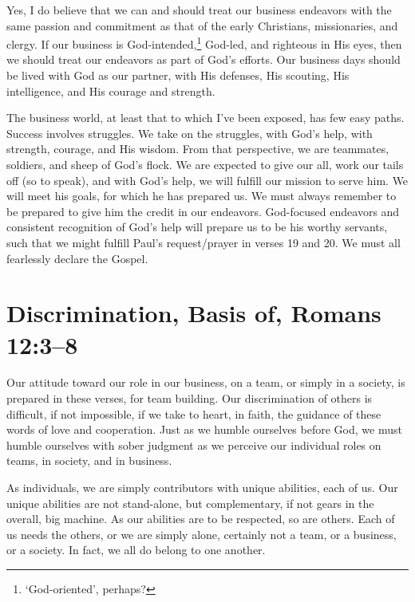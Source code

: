 \documentclass[12pt]{memoir}
\begin{document}
Yes, I do believe that we can and should treat our business endeavors
with the same passion and commitment as that of the early Christians,
missionaries, and clergy. If our business is God-intended,\footnote{`God-oriented', perhaps?} God-led,
and righteous in His eyes, then we should treat our endeavors as part
of God's efforts. Our business days should be lived with God as our
partner, with His defenses, His scouting, His intelligence, and His
courage and strength.


The business world, at least that to which I've been exposed, has
few easy paths. Success involves struggles. We take on the struggles,
with God's help, with strength, courage, and His wisdom. From that
perspective, we are teammates, soldiers, and sheep of God's flock.
We are expected to give our all, work our tails off (so to speak),
and with God's help, we will fulfill our mission to serve him. We
will meet his goals, for which he has prepared us. We must always
remember to be prepared to give him the credit in our endeavors.
God-focused
endeavors and consistent recognition of God's help will prepare us to be his worthy servants, such that we might fulfill Paul's request\slash{}prayer in verses 19 and 20. We must all fearlessly declare the Gospel.

\section[Discrimination, Basis of]{Discrimination, Basis of, Romans 12:3--8}

Our attitude toward our role in our business, on a team, or simply
in a society, is prepared in these verses, for team building. Our
discrimination of others is difficult, if not impossible, if we take
to heart, in faith, the guidance of these words of love and cooperation.
Just as we humble ourselves before God, we must humble ourselves with
sober judgment as we perceive our individual roles on teams, in society,
and in business.

As individuals, we are simply contributors with unique abilities,
each of us. Our unique abilities are not stand-alone, but complementary,
if not gears in the overall, big machine. As our abilities are to
be respected, so are others. Each of us needs the others, or we are
simply alone, certainly not a team, or a business, or a society. In
fact, we all do belong to one another.
\end{document}
